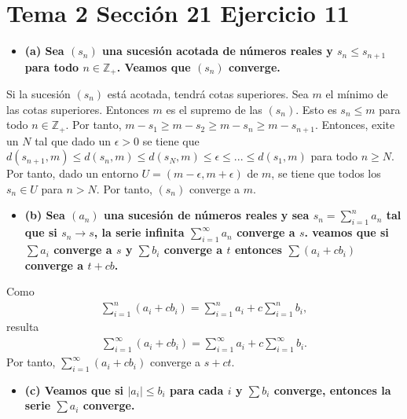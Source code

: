 \documentclass{article}
\begin{document}
\section{Tema 2 Sección 21 Ejercicio 11}
\begin{itemize}
\item \bf (a) \rm Sea $(s_n)$ una sucesión acotada de números reales y $s_n\leq s_{n+1}$ para todo $n\in \mathbb{Z}_+$. Veamos que $(s_n)$ converge.
\end{itemize}
Si la sucesión $(s_n)$ está acotada, tendrá cotas superiores. Sea $m$ el mínimo de las cotas superiores. Entonces $m$ es el supremo de las $(s_n)$. Esto es $s_n\leq m$ para todo $n\in \mathbb{Z}_+$. Por tanto, $m-s_1\geq m- s_2\geq m- s_{n}\geq m- s_{n+1}$. Entonces, exite un $N$ tal que dado un $\epsilon>0$ se tiene que $d(s_{n+1},m)\leq d(s_{n},m)\leq d(s_{N},m)\leq \epsilon\leq...\leq d(s_{1},m)$ para todo $n\geq N$. Por tanto, dado un entorno $U=(m-\epsilon,m+\epsilon)$ de $m$, se tiene que todos los $s_n\in U$ para $n>N$. Por tanto, $(s_n)$ converge a $m$.
\begin{itemize}
\item \bf (b) \rm Sea $(a_n)$ una sucesión de números reales y sea $s_n=\sum_{i=1}^{n}a_n$ tal que si $s_n\rightarrow s$, la serie infinita $\sum_{i=1}^{\infty}a_n$ converge a $s$. veamos que si $\sum a_i$ converge a $s$ y $\sum b_i$ converge a $t$ entonces $\sum (a_i+c b_i)$ converge a $t+cb$.
\end{itemize}
Como
\begin{eqnarray}
\sum_{i=1}^n\left( a_i+c b_i\right)=\sum_{i=1}^na_i+ c \sum_{i=1}^nb_i,\nonumber
\end{eqnarray}
resulta
\begin{eqnarray}
\sum_{i=1}^\infty\left( a_i+c b_i\right)=\sum_{i=1}^\infty a_i+ c \sum_{i=1}^\infty b_i.\nonumber
\end{eqnarray}
Por tanto, $\sum_{i=1}^\infty\left( a_i+c b_i\right)$ converge a $s+ct$.
\begin{itemize}
\item \bf (c) \rm Veamos que si $|a_i|\leq b_i$ para cada $i$ y  $\sum b_i$ converge, entonces la serie $\sum a_i$ converge.
\end{itemize}
\end{document}
